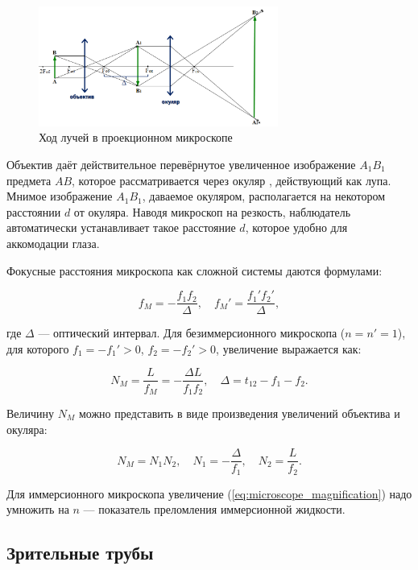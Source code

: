 \begin{figure}[h!]
\centering
\includegraphics[width=0.7\textwidth]{images/micro.png}
\caption{Ход лучей в проекционном микроскопе}
\label{fig:microscope}
\end{figure}

Объектив даёт действительное перевёрнутое увеличенное изображение $A_1B_1$ предмета $AB$, которое рассматривается через окуляр , действующий как лупа. Мнимое изображение $A_1B_1$, даваемое окуляром, располагается на некотором расстоянии $d$ от окуляра. Наводя микроскоп на резкость, наблюдатель автоматически устанавливает такое расстояние $d$, которое удобно для аккомодации глаза.

Фокусные расстояния микроскопа как сложной системы даются формулами:

\begin{equation}
f_M = -\frac{f_1 f_2}{\Delta}, \quad f_M' = \frac{f_1' f_2'}{\Delta},
\label{eq:microscope_focal}
\end{equation}

где $\Delta$ — оптический интервал. Для безиммерсионного микроскопа ($n = n' = 1$), для которого $f_1 = -f_1' > 0$, $f_2 = -f_2' > 0$, увеличение выражается как:

\begin{equation}
N_M = \frac{L}{f_M} = -\frac{\Delta L}{f_1 f_2}, \quad \Delta = t_{12} - f_1 - f_2.
\label{eq:microscope_magnification}
\end{equation}

Величину $N_M$ можно представить в виде произведения увеличений объектива и окуляра:

\begin{equation}
N_M = N_1 N_2, \quad N_1 = -\frac{\Delta}{f_1}, \quad N_2 = \frac{L}{f_2}.
\label{eq:components}
\end{equation}

Для иммерсионного микроскопа увеличение (\ref{eq:microscope_magnification}) надо умножить на $n$ — показатель преломления иммерсионной жидкости.

\subsection*{Зрительные трубы}

